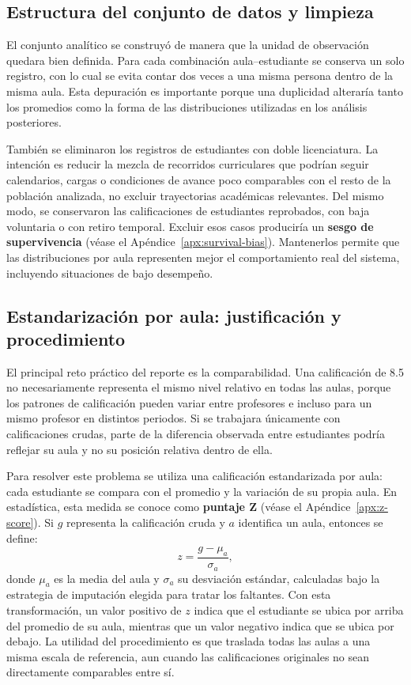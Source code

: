 \documentclass[10pt,letterpaper]{article} %
\numberwithin{figure}{subsection}
\begin{document}
\subsection{Estructura del conjunto de datos y limpieza}
El conjunto analítico se construyó de manera que la unidad de observación quedara bien definida. Para cada combinación aula--estudiante se conserva un solo registro, con lo cual se evita contar dos veces a una misma persona dentro de la misma aula. Esta depuración es importante porque una duplicidad alteraría tanto los promedios como la forma de las distribuciones utilizadas en los análisis posteriores.

También se eliminaron los registros de estudiantes con doble licenciatura. La intención es reducir la mezcla de recorridos curriculares que podrían seguir calendarios, cargas o condiciones de avance poco comparables con el resto de la población analizada, no excluir trayectorias académicas relevantes. Del mismo modo, se conservaron las calificaciones de estudiantes reprobados, con baja voluntaria o con retiro temporal. Excluir esos casos produciría un \textbf{sesgo de supervivencia} (véase el Apéndice~\ref{apx:survival-bias}). Mantenerlos permite que las distribuciones por aula representen mejor el comportamiento real del sistema, incluyendo situaciones de bajo desempeño.

\subsection{Estandarización por aula: justificación y procedimiento}
El principal reto práctico del reporte es la comparabilidad. Una calificación de 8.5 no necesariamente representa el mismo nivel relativo en todas las aulas, porque los patrones de calificación pueden variar entre profesores e incluso para un mismo profesor en distintos periodos. Si se trabajara únicamente con calificaciones crudas, parte de la diferencia observada entre estudiantes podría reflejar su aula y no su posición relativa dentro de ella.

Para resolver este problema se utiliza una calificación estandarizada por aula: cada estudiante se compara con el promedio y la variación de su propia aula. En estadística, esta medida se conoce como \textbf{puntaje Z} (véase el Apéndice~\ref{apx:z-score}). Si $g$ representa la calificación cruda y $a$ identifica un aula, entonces se define:
\[
z=\frac{g-\mu_a}{\sigma_a},
\]
donde $\mu_a$ es la media del aula y $\sigma_a$ su desviación estándar, calculadas bajo la estrategia de imputación elegida para tratar los faltantes. Con esta transformación, un valor positivo de $z$ indica que el estudiante se ubica por arriba del promedio de su aula, mientras que un valor negativo indica que se ubica por debajo. La utilidad del procedimiento es que traslada todas las aulas a una misma escala de referencia, aun cuando las calificaciones originales no sean directamente comparables entre sí.
\end{document}

